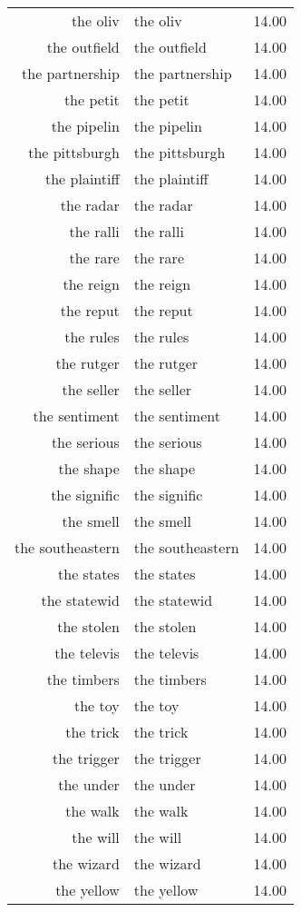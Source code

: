 \begin{table}[ht]
\begin{tabular}{rlr}
  the oliv & the oliv & 14.00 \\ 
  the outfield & the outfield & 14.00 \\ 
  the partnership & the partnership & 14.00 \\ 
  the petit & the petit & 14.00 \\ 
  the pipelin & the pipelin & 14.00 \\ 
  the pittsburgh & the pittsburgh & 14.00 \\ 
  the plaintiff & the plaintiff & 14.00 \\ 
  the radar & the radar & 14.00 \\ 
  the ralli & the ralli & 14.00 \\ 
  the rare & the rare & 14.00 \\ 
  the reign & the reign & 14.00 \\ 
  the reput & the reput & 14.00 \\ 
  the rules & the rules & 14.00 \\ 
  the rutger & the rutger & 14.00 \\ 
  the seller & the seller & 14.00 \\ 
  the sentiment & the sentiment & 14.00 \\ 
  the serious & the serious & 14.00 \\ 
  the shape & the shape & 14.00 \\ 
  the signific & the signific & 14.00 \\ 
  the smell & the smell & 14.00 \\ 
  the southeastern & the southeastern & 14.00 \\ 
  the states & the states & 14.00 \\ 
  the statewid & the statewid & 14.00 \\ 
  the stolen & the stolen & 14.00 \\ 
  the televis & the televis & 14.00 \\ 
  the timbers & the timbers & 14.00 \\ 
  the toy & the toy & 14.00 \\ 
  the trick & the trick & 14.00 \\ 
  the trigger & the trigger & 14.00 \\ 
  the under & the under & 14.00 \\ 
  the walk & the walk & 14.00 \\ 
  the will & the will & 14.00 \\ 
  the wizard & the wizard & 14.00 \\ 
  the yellow & the yellow & 14.00 \\ 

\end{tabular}
\end{table}

